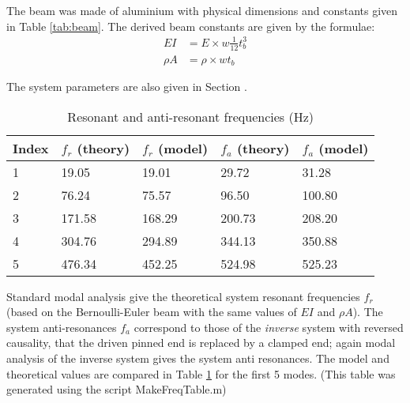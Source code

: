 The beam was made of aluminium with physical dimensions and constants
given in Table \ref{tab:beam}. The derived beam constants are given by the
formulae:
\begin{equation}
  \label{eq:formulae}
  \begin{align}
    EI &= E \times w \frac{1}{12} t_b^3\\
    \rho A &= \rho \times w t_b
  \end{align}
\end{equation}

The system parameters are also given in Section
.


\begin{table}[htbp]
  \begin{center}
    \begin{tabular}{||l|l|l|l|l||}
      \hline
      \hline
Index   & $f_r$ (theory) & $f_r$ (model)& $f_a$ (theory) & $f_a$ (model) \\ 
\hline
1       & 19.05         & 19.01         & 29.72         & 31.28\\ 
2       & 76.24         & 75.57         & 96.50         & 100.80\\ 
3       & 171.58        & 168.29        & 200.73        & 208.20\\ 
4       & 304.76        & 294.89        & 344.13        & 350.88\\ 
5       & 476.34        & 452.25        & 524.98        & 525.23\\ 
      \hline
      \hline
    \end{tabular}
    \caption{Resonant and anti-resonant frequencies (Hz)}
    \label{tab:freq}
  \end{center}
\end{table}

Standard modal analysis give the theoretical system resonant
frequencies $f_r$ (based on the Bernoulli-Euler beam with the same values of
$EI$ and $\rho A$). The system anti-resonances $f_a$ correspond to those of
the \emph{inverse} system with reversed causality, that the driven
pinned end is replaced by a clamped end; again modal analysis of the
inverse system gives the system anti resonances. The model and
theoretical values are compared in Table \ref{tab:freq} for the first
5 modes. (This table was generated using the script MakeFreqTable.m)

